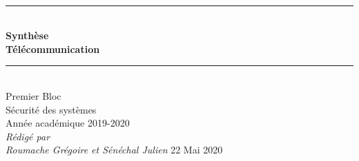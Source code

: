\documentclass[a4paper]{article}
\newcommand{\HRule}{\rule{\linewidth}{0.5mm}}
\begin{document}
\begin{titlepage}
    \begin{sffamily}
        \begin{center}
            \textnormal{}\\[6.5cm]
            \HRule \\[0.4cm]
            { \Huge \bfseries Synthèse\\ Télécommunication\\ [0.4cm] }
            \HRule \\[3cm]
            \Large
            Premier Bloc\\
            Sécurité des systèmes\\
            Année académique 2019-2020\\[0.5cm]
            \emph{Rédigé par}\\
            \emph{Roumache Grégoire et Sénéchal Julien}
            \vfill
            {\large 22 Mai 2020}
        \end{center}
    \end{sffamily}
\end{titlepage}
\end{document}
